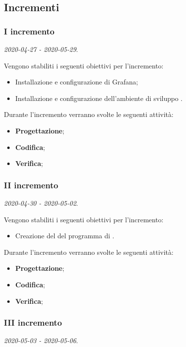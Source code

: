 \documentclass[../piano-di-progetto.tex]{subfiles}
\begin{document}
\subsection{Incrementi}

\subsubsection{I incremento}
\emph{2020-04-27 - 2020-05-29}. 
 
 Vengono stabiliti i seguenti obiettivi per l'incremento:
 \begin{itemize}
     \item Installazione e configurazione di Grafana;
     \item Installazione e configurazione dell'ambiente di sviluppo .
 \end{itemize}

Durante l'incremento verranno svolte le seguenti attività: 
\begin{itemize}
    \item \textbf{Progettazione};
    \item \textbf{Codifica};
    \item \textbf{Verifica};
\end{itemize}

\subsubsection{II incremento}
\emph{2020-04-30 - 2020-05-02}. 
 
 Vengono stabiliti i seguenti obiettivi per l'incremento:
 \begin{itemize}
     \item Creazione del  del programma di .
 \end{itemize}

Durante l'incremento verranno svolte le seguenti attività: 
\begin{itemize}
    \item \textbf{Progettazione};
    \item \textbf{Codifica};
    \item \textbf{Verifica};
\end{itemize}


\subsubsection{III incremento}
\emph{2020-05-03 - 2020-05-06}. 
 
\end{document}
